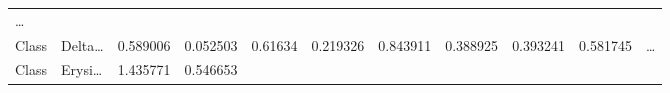 \documentclass[
]{article}
\begin{document}
\begin{longtable}[]{@{}lllllllllll@{}}
\begin{minipage}[t]{0.03\columnwidth}
\ldots{}\strut
\end{minipage}\tabularnewline
\begin{minipage}[t]{0.06\columnwidth}\raggedright
Class\strut
\end{minipage} & \begin{minipage}[t]{0.06\columnwidth}\raggedright
Delta\ldots{}\strut
\end{minipage} & \begin{minipage}[t]{0.09\columnwidth}\raggedright
0.589006\strut
\end{minipage} & \begin{minipage}[t]{0.06\columnwidth}\raggedright
0.052503\strut
\end{minipage} & \begin{minipage}[t]{0.09\columnwidth}\raggedright
0.61634\strut
\end{minipage} & \begin{minipage}[t]{0.06\columnwidth}\raggedright
0.219326\strut
\end{minipage} & \begin{minipage}[t]{0.09\columnwidth}\raggedright
0.843911\strut
\end{minipage} & \begin{minipage}[t]{0.06\columnwidth}\raggedright
0.388925\strut
\end{minipage} & \begin{minipage}[t]{0.06\columnwidth}\raggedright
0.393241\strut
\end{minipage} & \begin{minipage}[t]{0.06\columnwidth}\raggedright
0.581745\strut
\end{minipage} & \begin{minipage}[t]{0.03\columnwidth}\raggedright
\ldots{}\strut
\end{minipage}\tabularnewline
\begin{minipage}[t]{0.06\columnwidth}\raggedright
Class\strut
\end{minipage} & \begin{minipage}[t]{0.06\columnwidth}\raggedright
Erysi\ldots{}\strut
\end{minipage} & \begin{minipage}[t]{0.09\columnwidth}\raggedright
1.435771\strut
\end{minipage} & \begin{minipage}[t]{0.06\columnwidth}\raggedright
0.546653\strut
\end{minipage} & \begin{minipage}[t]{0.09\columnwidth}\raggedright

\end{minipage}
\end{longtable}
\end{document}
